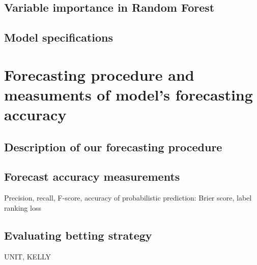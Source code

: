 \subsection{Variable importance in Random Forest}
\subsection{Model specifications}
\section{Forecasting procedure and measuments of model's forecasting accuracy}
\subsection{Description of our forecasting procedure}
\subsection{Forecast accuracy measurements}
Precision, recall, F-score, accuracy of probabilistic prediction: Brier score, label ranking loss
\subsection{Evaluating betting strategy}
UNIT, KELLY




